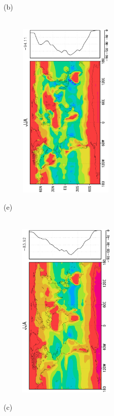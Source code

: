 \documentclass[12pt,a4paper,twoside,openright,headinclude,liststotoc,bibtotoc]{scrreprt}
\begin{document}
\begin{appendix}
\begin{figure}[b]
{}
\parbox{8.5cm}{\hspace{0.50cm}\begin{scriptsize} (b)\end{scriptsize} \vspace{-0.5cm} \\
\includegraphics[height=8.5cm,width=6.5cm,angle=-90]
{eps/zonalysmslhflu147JJA.eps}
}
\parbox{8.5cm}{\hspace{0.25cm}\begin{scriptsize} (e)\end{scriptsize} \vspace{-0.5cm} \\
\includegraphics[height=8.5cm,width=6.5cm,angle=-90]
{eps/zonalt21ysmslhfl147JJAfinal.eps}
}
\parbox{8.5cm}{\hspace{0.5cm}\begin{scriptsize} (c)\end{scriptsize} \vspace{-0.5cm} \\
}
\end{figure}
\end{appendix}
\end{document}
